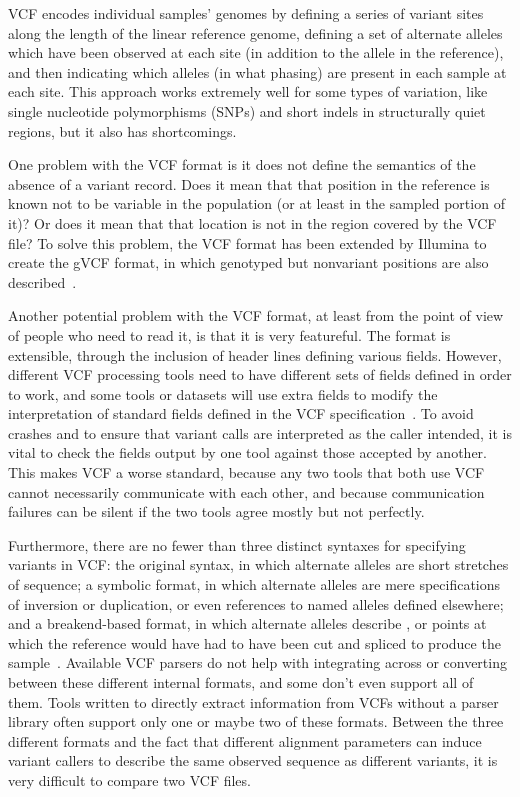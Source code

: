 VCF encodes individual samples' genomes by defining a series of variant sites along the length of the linear reference genome, defining a set of alternate alleles which have been observed at each site (in addition to the allele in the reference), and then indicating which alleles (in what phasing) are present in each sample at each site. This approach works extremely well for some types of variation, like single nucleotide polymorphisms (SNPs) and short indels in structurally quiet regions, but it also has shortcomings.

One problem with the VCF format is it does not define the semantics of the absence of a variant record. Does it mean that that position in the reference is known not to be variable in the population (or at least in the sampled portion of it)? Or does it mean that that location is not in the region covered by the VCF file? To solve this problem, the VCF format has been extended by Illumina to create the gVCF format, in which genotyped but nonvariant positions are also described~\cite{saunders2014about}.

Another potential problem with the VCF format, at least from the point of view of people who need to read it, is that it is very featureful. The format is extensible, through the inclusion of header lines defining various fields. However, different VCF processing tools need to have different sets of fields defined in order to work, and some tools or datasets \cite{sudmant2015integrated} will use extra fields to modify the interpretation of standard fields defined in the VCF specification~\cite{marshall2013variant}. To avoid crashes and to ensure that variant calls are interpreted as the caller intended, it is vital to check the fields output by one tool against those accepted by another. This makes VCF a worse standard, because any two tools that both use VCF cannot necessarily communicate with each other, and because communication failures can be silent if the two tools agree mostly but not perfectly.

Furthermore, there are no fewer than three distinct syntaxes for specifying variants in VCF: the original syntax, in which alternate alleles are short stretches of sequence; a symbolic format, in which alternate alleles are mere specifications of inversion or duplication, or even references to named alleles defined elsewhere; and a breakend-based format, in which alternate alleles describe , or points at which the reference would have had to have been cut and spliced to produce the sample~\cite{marshall2013variant}. Available VCF parsers do not help with integrating across or converting between these different internal formats, and some don't even support all of them. Tools written to directly extract information from VCFs without a parser library often support only one or maybe two of these formats. Between the three different formats and the fact that different alignment parameters can induce variant callers to describe the same observed sequence as different variants, it is very difficult to compare two VCF files.

